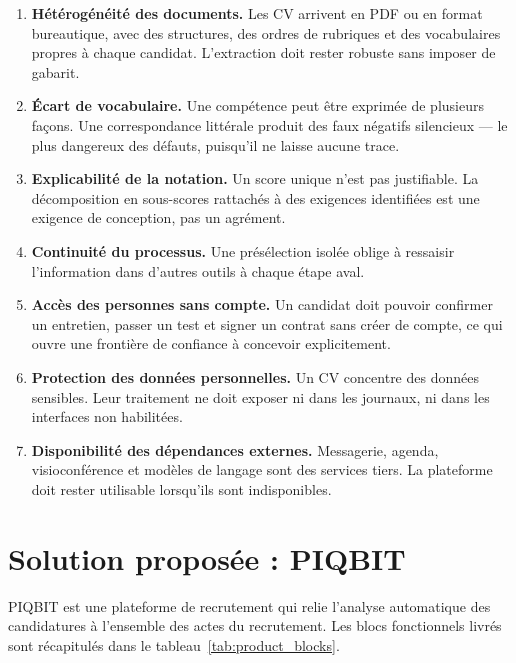 \begin{enumerate}[leftmargin=*]
  \item \textbf{Hétérogénéité des documents.} Les CV arrivent en PDF ou en
        format bureautique, avec des structures, des ordres de rubriques et
        des vocabulaires propres à chaque candidat. L'extraction doit rester
        robuste sans imposer de gabarit.
  \item \textbf{Écart de vocabulaire.} Une compétence peut être exprimée de
        plusieurs façons. Une correspondance littérale produit des faux
        négatifs silencieux — le plus dangereux des défauts, puisqu'il ne
        laisse aucune trace.
  \item \textbf{Explicabilité de la notation.} Un score unique n'est pas
        justifiable. La décomposition en sous-scores rattachés à des exigences
        identifiées est une exigence de conception, pas un agrément.
  \item \textbf{Continuité du processus.} Une présélection isolée oblige à
        ressaisir l'information dans d'autres outils à chaque étape aval.
  \item \textbf{Accès des personnes sans compte.} Un candidat doit pouvoir
        confirmer un entretien, passer un test et signer un contrat sans
        créer de compte, ce qui ouvre une frontière de confiance à concevoir
        explicitement.
  \item \textbf{Protection des données personnelles.} Un CV concentre des
        données sensibles. Leur traitement ne doit exposer ni dans les
        journaux, ni dans les interfaces non habilitées.
  \item \textbf{Disponibilité des dépendances externes.} Messagerie, agenda,
        visioconférence et modèles de langage sont des services tiers. La
        plateforme doit rester utilisable lorsqu'ils sont indisponibles.
\end{enumerate}

\section{Solution proposée : PIQBIT}
\label{sec:proposed_solution}

PIQBIT est une plateforme de recrutement qui relie l'analyse automatique des
candidatures à l'ensemble des actes du recrutement. Les blocs fonctionnels
livrés sont récapitulés dans le tableau~\ref{tab:product_blocks}.

